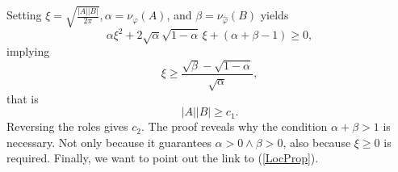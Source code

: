 \documentclass[12pt,a4paper]{article}
\begin{document}
Setting $\xi=\sqrt{\frac{|A||B|}{2\pi}}$,\,$\alpha=\nu_{\varphi}(A)$, and 
$\beta= \nu_{\hat\varphi}(B)$ yields
\begin{displaymath}
    \alpha\xi^2 + 2\sqrt{\alpha}\sqrt{1-\alpha}\,\xi+(\alpha+\beta-1)\geq 0,
\end{displaymath}
implying
\begin{displaymath}
      \xi \geq \frac{\sqrt{\beta}-\sqrt{1-\alpha}}{\sqrt{\alpha}},
\end{displaymath}
that is
\begin{displaymath}
     |A| |B| \geq c_1.
\end{displaymath}
Reversing the roles gives $c_2$. The proof reveals why the condition $\alpha+\beta>1$
is necessary. Not only because it guarantees $\alpha>0\wedge\beta>0$, also because
$\xi\geq0$ is required. Finally, we want to point out the link to (\ref{LocProp}).
%
%
\end{document}
